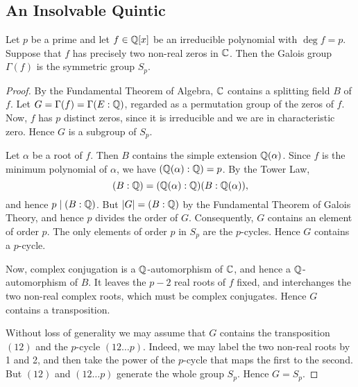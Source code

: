 \subsection{An Insolvable Quintic}
\begin{lemma}\label{lem:galois-gp-symmetric-gp}
	Let $p$ be a prime and let $f \in \mathbb{Q}[x]$ be an irreducible polynomial with $\deg{f} = p$. Suppose that $f$ has precisely two non-real zeros in $\mathbb{C}$. Then the Galois group $\Gamma(f)$ is the symmetric group $S_p$.
	\begin{proof}
		By the Fundamental Theorem of Algebra, $\mathbb{C}$ contains a splitting field $B$ of $f$. Let $G = \Gamma(f) = \Gamma(E : \mathbb{Q})$, regarded as a permutation group of the zeros of $f$. Now, $f$ has $p$ distinct zeros, since it is irreducible and we are in characteristic zero. Hence $G$ is a subgroup of $S_p$.
		
		Let $\alpha$ be a root of $f$. Then $B$ contains the simple extension $\mathbb{Q}(\alpha)$. Since $f$ is the minimum polynomial of $\alpha$, we have $(\mathbb{Q}(\alpha) : \mathbb{Q}) = p$. By the Tower Law,
		\[
			(B : \mathbb{Q}) = (\mathbb{Q}(\alpha) : \mathbb{Q})(B : \mathbb{Q}(\alpha)),
		\]
		and hence $p \mid (B : \mathbb{Q})$. But $|G| = (B : \mathbb{Q})$ by the Fundamental Theorem of Galois Theory, and hence $p$ divides the order of $G$. Consequently, $G$ contains an element of order $p$. The only elements of order $p$ in $S_p$ are the $p$-cycles. Hence $G$ contains a $p$-cycle.
		
		Now, complex conjugation is a $\mathbb{Q}$-automorphism of $\mathbb{C}$, and hence a $\mathbb{Q}$-automorphism of $B$. It leaves the $p - 2$ real roots of $f$ fixed, and interchanges the two non-real complex roots, which must be complex conjugates. Hence $G$ contains a transposition.
		
		Without loss of generality we may assume that $G$ contains the transposition $(12)$ and the $p$-cycle $(12 \dots p)$. Indeed, we may label the two non-real roots by 1 and 2, and then take the power of the $p$-cycle that maps the first to the second. But $(12)$ and $(12 \dots p)$ generate the whole group $S_p$. Hence $G = S_p$.
	\end{proof}
\end{lemma}

